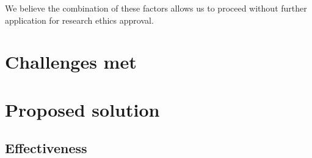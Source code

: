 We believe the combination of these factors allows us to proceed without further application for research ethics approval.

\section{Challenges met}

\section{Proposed solution}
\subsection{Effectiveness}

